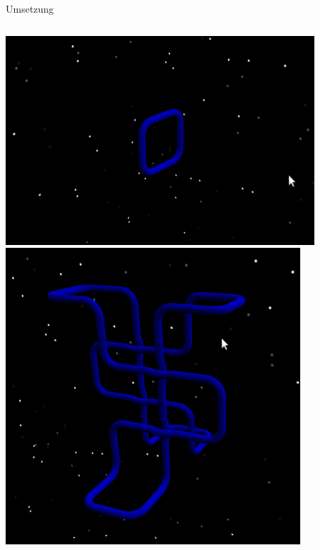\documentclass[18pt]{beamer}
\begin{document}
\begin{frame}{Umsetzung}
\begin{columns}[c]
 \includegraphics[scale=0.5]{simpelgeometry}
 \includegraphics[scale=0.5]{modifygeometry}
\end{columns}
\end{frame}
\end{document}
